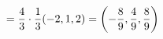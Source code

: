 \documentclass[preview]{standalone}
\begin{document}
\begin{align*}
\special{dvisvgm:raw <g id='unique000'>}=\dfrac{4}{3}\cdot\dfrac{1}{3}(-2,1,2)=\left(-\dfrac{8}{9},\dfrac{4}{9},\dfrac{8}{9}\right)\special{dvisvgm:raw </g>}
\end{align*}
\end{document}
